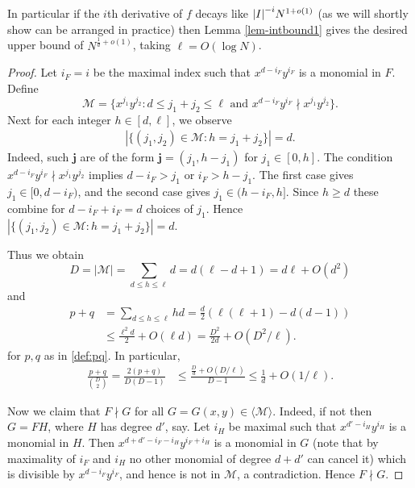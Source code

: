 \documentclass[12pt]{amsart}
\newcommand{\1}{{\mathbf 1}}
\theoremstyle{remark}
\theoremstyle{definition}
\begin{document}
In particular if the $i$th derivative of $f$ decays like $\abs{I}^{-i}N^{1+o(1)}$ (as we will shortly show can be arranged in practice) then Lemma \ref{lem-intbound1} gives the desired upper bound of $N^{\frac{1}{d}+o(1)}$, taking $\ell=O(\log N)$.
\begin{proof}
Let $i_F=i$ be the maximal index such that $x^{d-i_F}y^{i_F}$ is a monomial in $F$. Define
\[\mathcal{M} = \{ x^{j_1}y^{j_2} : d\leq j_1+j_2\leq \ell\textrm{ and }x^{d-i_F}y^{i_F}\nmid x^{j_1}y^{j_2}\}.\]
Next for each integer $h\in[d,\ell]$, we observe
\begin{align*}
|\{(j_1,j_2)\in \mathcal{M} : h=j_1+j_2\}| =d.
\end{align*}
Indeed, such $\mathbf{j}$ are of the form $\mathbf{j}=(j_1,h-j_1)$ for $j_1\in [0,h]$. The condition $x^{d-i_F}y^{i_F}\nmid x^{j_1}y^{j_2}$ implies $d-i_F > j_1$ or $i_F>h-j_1$. The first case gives $j_1\in [0,d-i_F)$, and the second case gives $j_1\in (h-i_F,h]$. Since $h\geq d$ these combine for $d-i_F + i_F = d$ choices of $j_1$. Hence $|\{(j_1,j_2)\in \mathcal{M} : h=j_1+j_2\}| =d$.

Thus we obtain
\begin{equation}
D =\lvert \mathcal{M}\rvert = \sum_{d\le h\le \ell} d  =d(\ell-d+1) = d\ell+O(d^2) \label{eq:Dcompute}
\end{equation}
and
\begin{align}
p+q &=\sum_{d\le h\le \ell} hd=\frac{d}{2}(\ell(\ell+1)-d(d-1)) \label{eq:p+qcompute} \\
&\leq\frac{\ell^2d}{2}+O(\ell d)=\frac{D^2}{2d}+O(D^2/\ell).\nonumber
\end{align}
for $p,q$ as in \eqref{def:pq}. In particular, 
\begin{align}\label{eq:pDchoose2}
\frac{p+q}{\binom{D}{2}} =\frac{2(p+q)}{D(D-1)} &\le \frac{\frac{D}{d}+O(D/\ell)}{D-1}
\le \frac{1}{d}+ O(1/\ell ).
\end{align}

Now we claim that $F\nmid G$ for all $G=G(x,y)\in\langle \mathcal{M}\rangle$. Indeed, if not then $G=FH$, where $H$ has degree $d'$, say. Let $i_H$ be maximal such that $x^{d'-i_H}y^{i_H}$ is a monomial in $H$. Then $x^{d+d'-i_F-i_H}y^{i_F+i_H}$ is a monomial in $G$ (note that by maximality of $i_F$ and $i_H$ no other monomial of degree $d+d'$ can cancel it) which is divisible by $x^{d-i_F}y^{i_F}$, and hence is not in $\mathcal{M}$, a contradiction. Hence $F\nmid G$.


\end{proof}
\end{document}
